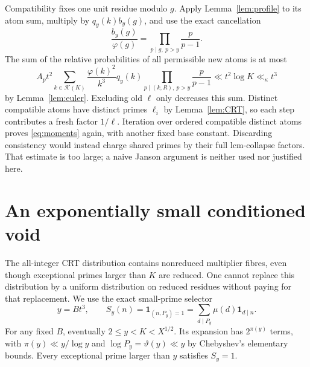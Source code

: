 \documentclass[10pt,reqno]{amsart}
\theoremstyle{remark}
\newcommand{\K}{\mathcal K}
\newcommand{\ind}{\mathbf1}
\begin{document}
Compatibility fixes one unit residue modulo $g$.  Apply
Lemma~\ref{lem:profile} to its atom sum, multiply by $q_y(k)b_y(g)$,
and use the exact cancellation
\begin{equation}\label{eq:cancel}
 \frac{b_y(g)}{\varphi(g)}
       =\prod_{p\mid g,\ p>y}\frac p{p-1}.
\end{equation}
The sum of the relative probabilities of all permissible new atoms is
at most
\[
 A_pt^2\sum_{k\in\K(K)}\frac{\varphi(k)^2}{k^3}q_y(k)
               \prod_{p\mid(k,R),\ p>y}\frac p{p-1}
 \ll t^2\log K\ll_\kappa t^3
\]
by Lemma~\ref{lem:euler}.  Excluding old $\ell$ only decreases this sum.
Distinct compatible atoms have distinct primes $\ell_i$ by
Lemma~\ref{lem:CRT}, so each step contributes a fresh factor $1/\ell$.
Iteration over ordered compatible distinct atoms proves
\eqref{eq:moments} again, with another fixed base constant.
Discarding consistency would instead charge shared primes by their full
lcm-collapse factors.  That estimate is too large; a naive Janson
argument is neither used nor justified here.

\section{An exponentially small conditioned void}\label{sec:void}
The all-integer CRT distribution contains nonreduced multiplier fibres,
even though exceptional primes larger than $K$ are reduced.  One cannot
replace this distribution by a uniform distribution on reduced residues
without paying for that replacement.  We use the exact small-prime selector
\begin{equation}\label{eq:selector}
 y=Bt^3,\qquad S_y(n)=\ind_{(n,P_y)=1}
       =\sum_{d\mid P_y}\mu(d)\ind_{d\mid n}.
\end{equation}
For any fixed $B$, eventually $2\leq y<K<X^{1/2}$.  Its expansion has
$2^{\pi(y)}$ terms, with $\pi(y)\ll y/\log y$ and
$\log P_y=\vartheta(y)\ll y$ by Chebyshev's elementary bounds.
Every exceptional prime larger than $y$ satisfies $S_y=1$.
\end{document}

